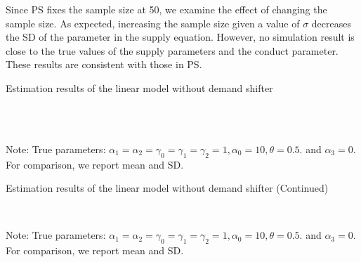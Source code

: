 \documentclass[11pt, a4paper]{article}
\begin{document}
Since PS fixes the sample size at 50, we examine the effect of changing the sample size.
As expected, increasing the sample size given a value of $\sigma$ decreases the SD of the parameter in the supply equation. 
However, no simulation result is close to the true values of the supply parameters and the conduct parameter. 
These results are consistent with those in PS.

\begin{table}[!htbp]
  \begin{center}
      \caption{Estimation results of the linear model without demand shifter}
      \label{tb:linear_linear_sigma_1_without_demand_shifter_y} 
      \subfloat[$\sigma=0.001$]{}\\
      \subfloat[$\sigma=0.5$]{}\\
  \end{center}\footnotesize
  Note: True parameters: $\alpha_1 = \alpha_2 =  \gamma_0 = \gamma_1 = \gamma_2  =  1, \alpha_0 = 10, \theta = 0.5.$ and $\alpha_3 =0$. For comparison, we report mean and SD.
\end{table} 

\begin{table}[!htbp]
  \ContinuedFloat
  \begin{center}
      \caption{Estimation results of the linear model without demand shifter (Continued)}
      \subfloat[$\sigma=1.0$]{}\\
    \subfloat[$\sigma=2.0$]{}
  \end{center}\footnotesize
  Note: True parameters: $\alpha_1 = \alpha_2 =  \gamma_0 = \gamma_1 = \gamma_2  =  1, \alpha_0 = 10, \theta = 0.5.$ and $\alpha_3 =0$. For comparison, we report mean and SD.
\end{table} 
\end{document}
